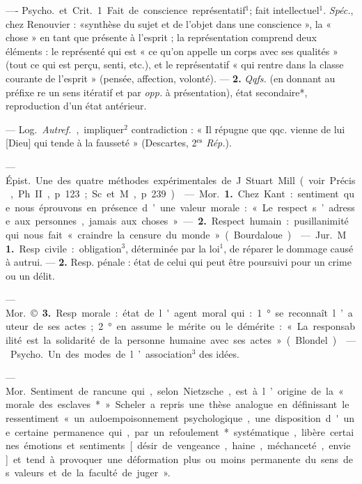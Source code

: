 \begin{itemize}[leftmargin=1cm, label=, itemsep=1pt]
 —- \si{Psycho.} et \si{Crit.}
1. Fait de conscience représentatif$^1$;
fait intellectuel$^1$. {\it Spéc.}, chez Renouvier : «synthèse du sujet et de l’objet
dans une conscience », la « chose »
en tant que présente à l'esprit ; la
représentation comprend deux éléments : le représenté qui est « ce
qu’on appelle un corps avec ses qualités » (tout ce qui est perçu, senti,
etc.), et le représentatif « qui rentre
dans la classe courante de l'esprit »
(pensée, affection, volonté). — {\bf 2.}
{\it Qqfs.} (en donnant au préfixe re un
sens itératif et par {\it opp.} à présentation), état secondaire*, reproduction d’un état antérieur.

 — \si{Log.} {\it Autref.}, impliquer$^2$
contradiction : « Il répugne que
qqc. vienne de lui [Dieu] qui tende
à la fausseté » (Descartes, 2$^\text{es}$ {\it Rép.}).

 — \si{Épist.} Une
des quatre méthodes expérimentales de J. Stuart Mill (voir Précis,
Ph. II, p. 123; Sc. et M., p. 239).

 — \si{Mor.} {\bf 1.} Chez Kant : sentiment que nous éprouvons en présence d’une valeur morale : « Le
respect s’adresse aux personnes, jamais aux choses » — {\bf 2.} Respect
humain : pusillanimité qui nous fait
« craindre la censure du monde »
(Bourdaloue).

 — \si{Jur.} M {\bf 1.} Resp. civile:
obligation$^3$, déterminée par la loi$^1$,
de réparer le dommage causé à
autrui. — {\bf 2.} Resp. pénale : état de
celui qui peut être poursuivi pour
un crime ou un délit.

— \si{Mor.} ©. {\bf 3.} Resp. morale : état de
l'agent moral qui : 1° se reconnaît
l’auteur de ses actes; 2° en assume
le mérite ou le démérite : « La responsabilité est la solidarité de la
personne humaine avec ses actes »
(Blondel).

 —
\si{Psycho.} Un des modes de l’association$^3$ des idées.

 — \si{Mor.} Sentiment de
rancune qui, selon Nietzsche, est à
l’origine de la « morale des esclaves* »
Scheler a repris une thèse analogue
en définissant le ressentiment « un
auloempoisonnement psychologique,...
une disposition d'une certaine permanence qui, par un refoulement*
systématique, libère certaines émotions et sentiments [désir de vengeance, haine, méchanceté, envie]
et tend à provoquer une déformation plus ou moins permanente du
sens des valeurs et de la faculté de
juger ».


\end{itemize}
